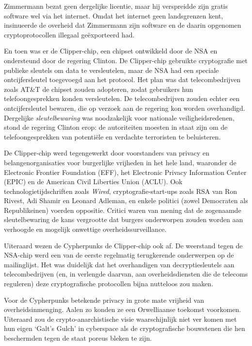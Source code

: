 \documentclass[smalldemyvopaper,11pt,twoside,onecolumn,openright,extrafontsizes,hidelinks]{memoir}
\begin{document}
Zimmermann bezat geen dergelijke licentie, maar hij verspreidde zijn
gratis software wel via het internet. Omdat het internet geen
landsgrenzen kent, insinueerde de overheid dat Zimmermann zijn software
en de daarin opgenomen cryptoprotocollen illegaal geëxporteerd had.

En toen was er de Clipper-chip, een chipset ontwikkeld door de NSA en
ondersteund door de regering Clinton. De Clipper-chip gebruikte
cryptografie met publieke sleutels om data te versleutelen, maar de NSA
had een speciale ontcijfersleutel toegevoegd aan het protocol. Het plan
was dat telecombedrijven zoals AT\&T de chipset zouden adopteren, zodat
gebruikers hun telefoongesprekken konden versleutelen. De
telecombedrijven zouden echter een ontcijfersleutel bewaren, die op
verzoek aan de regering kon worden overhandigd. Dergelijke
\emph{sleutelbewaring} was noodzakelijk voor nationale
veiligheidsredenen, stond de regering Clinton erop: de autoriteiten
moesten in staat zijn om de telefoongesprekken van potentiële en
verdachte terroristen te beluisteren.

De Clipper-chip werd tegengewerkt door voorstanders van privacy en
belangenorganisaties voor burgerlijke vrijheden in het hele land,
waaronder de Electronic Frontier Foundation (EFF), het Electronic
Privacy Information Center (EPIC) en de American Civil Liberties Union
(ACLU). Ook technologietijdschriften zoals \emph{Wired},
cryptografie-start-ups zoals RSA van Ron Rivest, Adi Shamir en Leonard
Adleman, en enkele politici (zowel Democraten als Republikeinen) voerden
oppositie. Critici waren van mening dat de zogenaamde sleutelbewaring de
kans vergrootte dat burgers onderworpen zouden worden aan verhoogde en
mogelijk onwettige overheidssurveillance.

Uiteraard wezen de Cypherpunks de Clipper-chip ook af. De weerstand
tegen de NSA-chip werd een van de eerste regelmatig terugkerende
onderwerpen op de mailinglijst. Het was duidelijk dat het overhandigen
van decryptiesleutels aan telecombedrijven (en, in verlengde daarvan,
aan overheidsdiensten die de telecoms reguleren) deze cryptografische
protocollen bijna nutteloos zou maken.

Voor de Cypherpunks betekende privacy in grote mate vrijheid van
overheidsinmenging. Aalen zo konden ze een Orwelliaanse toekomst
voorkomen. Uiteraard zou de crypto-anarchistische visie waarschijnlijk
niet ver komen met hun eigen `Galt's Gulch' in cyberspace als de
cryptografische bouwstenen die hen beschermden tegen de staat poreus
bleken te zijn.
\end{document}
